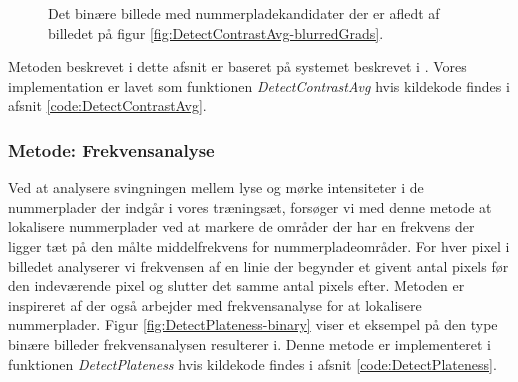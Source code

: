 \begin{figure}[htp]
  \centering
  \caption{Det binære billede med nummerpladekandidater der er afledt af billedet på figur \vref{fig:DetectContrastAvg-blurredGrads}.}
  \label{fig:DetectContrastAvg-binary}
\end{figure}

Metoden beskrevet i dette afsnit er baseret på systemet beskrevet i \cite{shapiro}. Vores implementation er lavet som funktionen \textit{DetectContrastAvg} hvis kildekode findes i afsnit \vref{code:DetectContrastAvg}.

\subsubsection{Metode: Frekvensanalyse}
\label{sec:frekvensanalyse}
Ved at analysere svingningen mellem lyse og mørke intensiteter i de nummerplader der indgår i vores træningsæt, forsøger vi med denne metode at lokalisere nummerplader ved at markere de områder der har en frekvens der ligger tæt på den målte middelfrekvens for nummerpladeområder.  For hver pixel i billedet analyserer vi frekvensen af en linie der begynder et givent antal pixels før den indeværende pixel og slutter det samme antal pixels efter. Metoden er inspireret af \cite{kwas} der også arbejder med frekvensanalyse for at lokalisere nummerplader. Figur \vref{fig:DetectPlateness-binary} viser et eksempel på den type binære billeder frekvensanalysen resulterer i. Denne metode er implementeret i funktionen \textit{DetectPlateness} hvis kildekode findes i afsnit \vref{code:DetectPlateness}.

